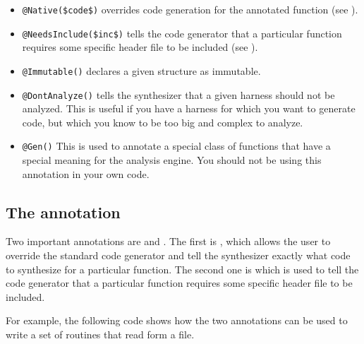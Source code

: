 \begin{itemize}
\item \lstinline!@Native($code$)! overrides code generation for the annotated function (see ).
\item \lstinline!@NeedsInclude($inc$)!  tells the code generator that a particular function requires some specific header file to be included (see ).
\item \lstinline!@Immutable()! declares a given structure as immutable.
\item \lstinline!@DontAnalyze()! tells the synthesizer that a given harness should not be analyzed. This is useful if you have a harness for which you want to generate code, but which you know to be too big and complex to analyze.
\item \lstinline!@Gen()! This is used to annotate a special class of functions that have a special meaning for the analysis engine. You should not be using this annotation in your own code.
\end{itemize}




\subsection{The  annotation}

Two important annotations are  and . The first is , which allows the user to override the standard code generator and tell the synthesizer exactly what code to synthesize for a particular function. The second one is  which is used to tell the code generator that a particular function requires some specific header file to be included.

For example, the following code shows how the two  annotations can be used to write a set of routines that read form a file.

